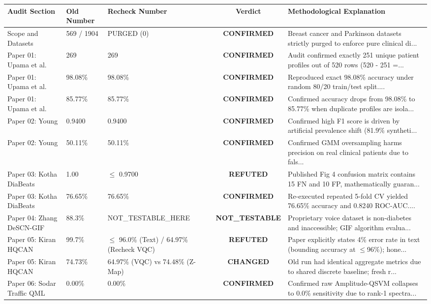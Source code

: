 \documentclass[10pt,twocolumn]{article}
\begin{document}
\begin{table}[t]
\centering
\small
\begin{tabular}{lllcl}
\toprule
\textbf{Audit Section} & \textbf{Old Number} & \textbf{Recheck Number} & \textbf{Verdict} & \textbf{Methodological Explanation} \\
\midrule
Scope and Datasets & 569 / 1904 & PURGED (0) & \textbf{CONFIRMED} & Breast cancer and Parkinson datasets strictly purged to enforce pure clinical di... \\
Paper 01: Upama et al. & 269 & 269 & \textbf{CONFIRMED} & Audit confirmed exactly 251 unique patient profiles out of 520 rows (520 - 251 =... \\
Paper 01: Upama et al. & 98.08\% & 98.08\% & \textbf{CONFIRMED} & Reproduced exact 98.08\% accuracy under random 80/20 train/test split.... \\
Paper 01: Upama et al. & 85.77\% & 85.77\% & \textbf{CONFIRMED} & Confirmed accuracy drops from 98.08\% to 85.77\% when duplicate profiles are isola... \\
Paper 02: Young & 0.9400 & 0.9400 & \textbf{CONFIRMED} & Confirmed high F1 score is driven by artificial prevalence shift (81.9\% syntheti... \\
Paper 02: Young & 50.11\% & 50.11\% & \textbf{CONFIRMED} & Confirmed GMM oversampling harms precision on real clinical patients due to fals... \\
Paper 03: Kotha DiaBeats & 1.00 & $\le$ 0.9700 & \textbf{REFUTED} & Published Fig 4 confusion matrix contains 15 FN and 10 FP, mathematically guaran... \\
Paper 03: Kotha DiaBeats & 76.65\% & 76.65\% & \textbf{CONFIRMED} & Re-executed repeated 5-fold CV yielded 76.65\% accuracy and 0.8240 ROC-AUC.... \\
Paper 04: Zhang DeSCN-GIF & 88.3\% & NOT\_TESTABLE\_HERE & \textbf{NOT\_TESTABLE} & Proprietary voice dataset is non-diabetes and inaccessible; GIF algorithm evalua... \\
Paper 05: Kiran HQCAN & 99.7\% & $\le$ 96.0\% (Text) / 64.97\% (Recheck VQC) & \textbf{REFUTED} & Paper explicitly states 4\% error rate in text (bounding accuracy at $\le$96\%); hone... \\
Paper 05: Kiran HQCAN & 74.73\% & 64.97\% (VQC) vs 74.48\% (Z-Map) & \textbf{CHANGED} & Old run had identical aggregate metrics due to shared discrete baseline; fresh r... \\
Paper 06: Sodar Traffic QML & 0.00\% & 0.00\% & \textbf{CONFIRMED} & Confirmed raw Amplitude-QSVM collapses to 0.0\% sensitivity due to rank-1 spectra... \\

\end{tabular}
\end{table}
\end{document}

